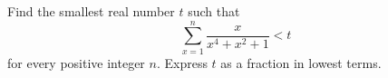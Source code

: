 Find the smallest real number $t$ such that
\[\sum_{x=1}^{n}\dfrac{x}{x^4+x^2+1}<t\]
for every positive integer $n$. Express $t$ as a fraction in lowest terms.
